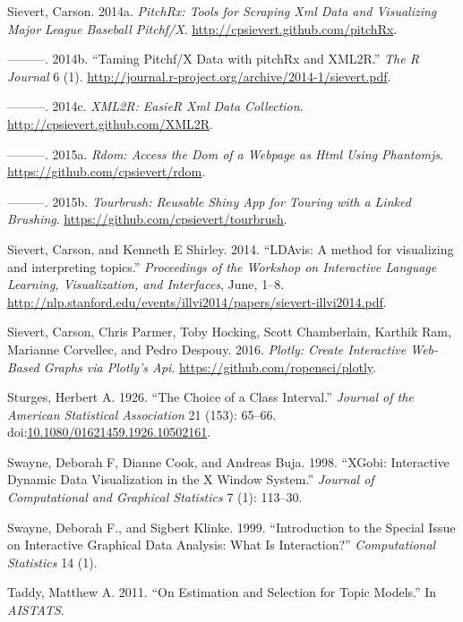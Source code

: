 \documentclass[12pt,]{isuthesis}
\begin{document}
\hypertarget{ref-pitchRx}{}
Sievert, Carson. 2014a. \emph{PitchRx: Tools for Scraping Xml Data and
Visualizing Major League Baseball Pitchf/X}.
\url{http://cpsievert.github.com/pitchRx}.

\hypertarget{ref-Sievert:2014a}{}
---------. 2014b. ``Taming Pitchf/X Data with pitchRx and XML2R.''
\emph{The R Journal} 6 (1).
\url{http://journal.r-project.org/archive/2014-1/sievert.pdf}.

\hypertarget{ref-XML2R}{}
---------. 2014c. \emph{XML2R: EasieR Xml Data Collection}.
\url{http://cpsievert.github.com/XML2R}.

\hypertarget{ref-rdom}{}
---------. 2015a. \emph{Rdom: Access the Dom of a Webpage as Html Using
Phantomjs}. \url{https://github.com/cpsievert/rdom}.

\hypertarget{ref-tourbrush}{}
---------. 2015b. \emph{Tourbrush: Reusable Shiny App for Touring with a
Linked Brushing}. \url{https://github.com/cpsievert/tourbrush}.

\hypertarget{ref-Sievert:2014b}{}
Sievert, Carson, and Kenneth E Shirley. 2014. ``LDAvis: A method for
visualizing and interpreting topics.'' \emph{Proceedings of the Workshop
on Interactive Language Learning, Visualization, and Interfaces}, June,
1--8.
\url{http://nlp.stanford.edu/events/illvi2014/papers/sievert-illvi2014.pdf}.

\hypertarget{ref-plotly}{}
Sievert, Carson, Chris Parmer, Toby Hocking, Scott Chamberlain, Karthik
Ram, Marianne Corvellec, and Pedro Despouy. 2016. \emph{Plotly: Create
Interactive Web-Based Graphs via Plotly's Api}.
\url{https://github.com/ropensci/plotly}.

\hypertarget{ref-Sturges}{}
Sturges, Herbert A. 1926. ``The Choice of a Class Interval.''
\emph{Journal of the American Statistical Association} 21 (153): 65--66.
doi:\href{https://doi.org/10.1080/01621459.1926.10502161}{10.1080/01621459.1926.10502161}.

\hypertarget{ref-xgobi}{}
Swayne, Deborah F, Dianne Cook, and Andreas Buja. 1998. ``XGobi:
Interactive Dynamic Data Visualization in the X Window System.''
\emph{Journal of Computational and Graphical Statistics} 7 (1): 113--30.

\hypertarget{ref-swayne-klinke}{}
Swayne, Deborah F., and Sigbert Klinke. 1999. ``Introduction to the
Special Issue on Interactive Graphical Data Analysis: What Is
Interaction?'' \emph{Computational Statistics} 14 (1).

\hypertarget{ref-Taddy}{}
Taddy, Matthew A. 2011. ``On Estimation and Selection for Topic
Models.'' In \emph{AISTATS}.
\end{document}
